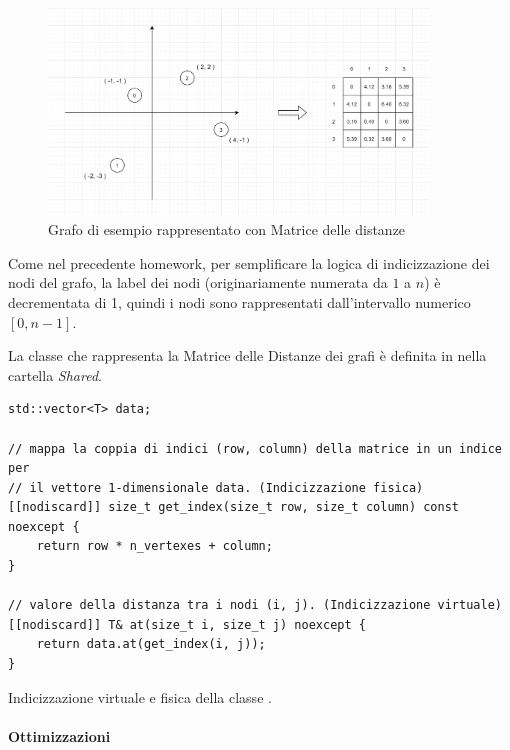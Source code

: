 \begin{figure}[h]
	\centering
	\includegraphics[width=0.9\textwidth]{./images/Distance Matrix.png}
	\caption{Grafo di esempio rappresentato con Matrice delle distanze}
	\label{fig:distancematrix-example}
\end{figure}

\noindent Come nel precedente homework, per semplificare la logica di indicizzazione dei nodi del grafo, la label dei nodi (originariamente numerata da $1$ a $n$) è decrementata di 1, quindi i nodi sono rappresentati dall'intervallo numerico $[0, n-1]$.

\noindent La classe che rappresenta la Matrice delle Distanze dei grafi è definita in  nella cartella \textit{Shared}.

\begin{listing}[!ht]
\begin{verbatim}
std::vector<T> data;

// mappa la coppia di indici (row, column) della matrice in un indice per
// il vettore 1-dimensionale data. (Indicizzazione fisica)
[[nodiscard]] size_t get_index(size_t row, size_t column) const noexcept {
    return row * n_vertexes + column;
}

// valore della distanza tra i nodi (i, j). (Indicizzazione virtuale)
[[nodiscard]] T& at(size_t i, size_t j) noexcept {
    return data.at(get_index(i, j));
}
\end{verbatim}
\caption{Indicizzazione virtuale e fisica della classe .}
\label{listing:virtual-physica-addressing}
\end{listing}

\paragraph{Ottimizzazioni}\mbox{} \\

